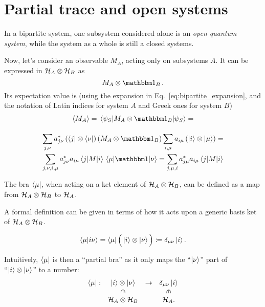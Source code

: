 \section{Partial trace and open systems}
\label{sec:p_tr}

In a bipartite system, one subsystem considered alone is an
\emph{open quantum system},
while the system as a whole is still a closed systems.

Now, let's consider an observable $M_A$, acting only on subsystems $A$.
It can be expressed in $\mathcal{H}_A \otimes \mathcal{H}_B$ as
\[
  M_A \otimes \idop_B\, .
\]
Its expectation value is
(using the expansion in Eq.~\eqref{eq:bipartite_expansion},
and the notation of Latin indices for system $A$ and Greek ones for system $B$)
\begin{multline}\label{eq:exp_subsys}
  \expval{M_A} = \matrixel{\psi_S}{M_A\otimes\idop_B}{\psi_S} = \\[1em]
  \sum_{j,\nu}a^{*}_{j\nu}\left(\bra{j}\otimes\bra{\nu}\right)\left(M_A\otimes\idop_B\right)\sum_{i,\mu}a_{i\mu}\left(\ket{i}\otimes\ket{\mu}\right) = \\
  \sum_{j,\nu,i,\mu}a^{*}_{j\nu}a_{i\mu}\matrixel{j}{M}{i}\matrixel{\mu}{\idop}{\nu} =
  \sum_{j,\mu,i}a^{*}_{j\mu}a_{i\mu}\matrixel{j}{M}{i}
\end{multline}

The bra $\bra{\mu}$, when acting on a ket element of $\mathcal{H}_{A} \otimes \mathcal{H}_{B}$,
can be defined
as a map from $\mathcal{H}_A\otimes\mathcal{H}_B$ to $\mathcal{H}_A$.

A formal definition can be given in terms of how it acts upon a generic
basis ket of $\mathcal{H}_A\otimes\mathcal{H}_B$.

\begin{definition}\label{def:pBra}
\[
  \braket{\mu}{i\nu} = \bra{\mu}\Big(\ket{i}\otimes\ket{\nu}\Big) \coloneqq \delta_{\mu\nu}\ket{i} \text{.}
\]
\end{definition}

Intuitively, $\bra{\mu}$ is then a ``partial bra''
as it only maps the ``$\ket{\nu}$'' part of\\
``$\ket{i}\otimes\ket{\nu}$''
to a number:
\[
  \begin{array}{cccc}
    \bra{\mu}:  & \ket{i}\ox\ket{\nu}                   & \rightarrow & \delta_{\mu\nu}\ket{i}                \\
                & \rotatebox[origin=c]{270}{$\in$}      &             & \rotatebox[origin=c]{270}{$\in$}      \\
                & \hilb{H}_A\ox\hilb{H}_B               &             & \hilb{H}_A   \text{.}
  \end{array}
\]

